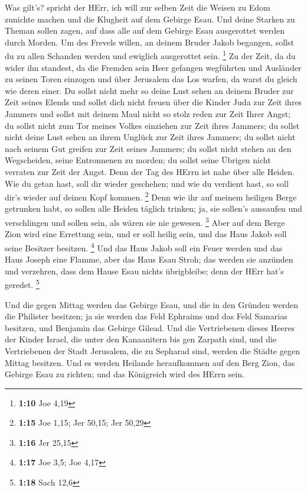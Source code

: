  Was gilt's? spricht der HErr, ich will zur selben Zeit die
Weisen zu Edom zunichte machen und die Klugheit auf dem Gebirge Esau.
 Und deine Starken zu Theman sollen zagen, auf dass alle auf
dem Gebirge Esau ausgerottet werden durch Morden.  Um des
Frevels willen, an deinem Bruder Jakob begangen, sollst du zu allen
Schanden werden und ewiglich ausgerottet sein. \footnote{\textbf{1:10}
  Joe 4,19}  Zu der Zeit, da du wider ihn standest, da die
Fremden sein Heer gefangen wegführten und Ausländer zu seinen Toren
einzogen und über Jerusalem das Los warfen, da warst du gleich wie deren
einer.  Du sollst nicht mehr so deine Lust sehen an deinem
Bruder zur Zeit seines Elends und sollst dich nicht freuen über die
Kinder Juda zur Zeit ihres Jammers und sollst mit deinem Maul nicht so
stolz reden zur Zeit Ihrer Angst;  du sollst nicht zum Tor
meines Volkes einziehen zur Zeit ihres Jammers; du sollst nicht deine
Lust sehen an ihrem Unglück zur Zeit ihres Jammers; du sollst nicht nach
seinem Gut greifen zur Zeit seines Jammers;  du sollst
nicht stehen an den Wegscheiden, seine Entronnenen zu morden; du sollst
seine Übrigen nicht verraten zur Zeit der Angst.  Denn der
Tag des HErrn ist nahe über alle Heiden. Wie du getan hast, soll dir
wieder geschehen; und wie du verdient hast, so soll dir's wieder auf
deinen Kopf kommen. \footnote{\textbf{1:15} Joe 1,15; Jer 50,15; Jer
  50,29}  Denn wie ihr auf meinem heiligen Berge getrunken
habt, so sollen alle Heiden täglich trinken; ja, sie sollen's aussaufen
und verschlingen und sollen sein, als wären sie nie gewesen. \footnote{\textbf{1:16}
  Jer 25,15}  Aber auf dem Berge Zion wird eine Errettung
sein, und er soll heilig sein, und das Haus Jakob soll seine Besitzer
besitzen. \footnote{\textbf{1:17} Joe 3,5; Joe 4,17}  Und
das Haus Jakob soll ein Feuer werden und das Haus Joseph eine Flamme,
aber das Haus Esau Stroh; das werden sie anzünden und verzehren, dass
dem Hause Esau nichts übrigbleibe; denn der HErr hat's geredet.
\footnote{\textbf{1:18} Sach 12,6}

 Und die gegen Mittag werden das Gebirge Esau, und die in
den Gründen werden die Philister besitzen; ja sie werden das Feld
Ephraims und das Feld Samarias besitzen, und Benjamin das Gebirge
Gilead.  Und die Vertriebenen dieses Heeres der Kinder
Israel, die unter den Kanaanitern bis gen Zarpath sind, und die
Vertriebenen der Stadt Jerusalem, die zu Sepharad sind, werden die
Städte gegen Mittag besitzen.  Und es werden Heilande
heraufkommen auf den Berg Zion, das Gebirge Esau zu richten; und das
Königreich wird des HErrn sein.

